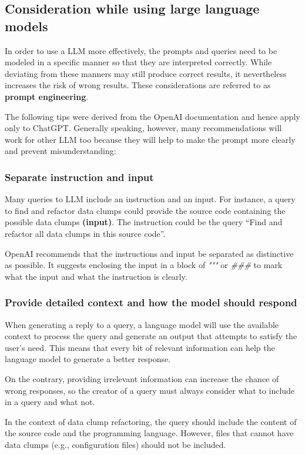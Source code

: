 \subsection{Consideration while using large language models}
In order to use a \ac{LLM} more effectively, the prompts and queries need to be modeled in a specific manner so that they are interpreted correctly. While deviating from these manners may still produce correct results, it nevertheless increases the risk of wrong results. These considerations are  referred to as \textbf{prompt engineering}.

The following tips were derived from the OpenAI documentation \cite{ChatGPT_url} and hence apply only to ChatGPT. Generally speaking, however, many recommendations will work for other \ac{LLM} too because they will help to make the prompt more clearly and prevent misunderstanding:

\subsubsection{Separate instruction and input}
Many queries to \ac{LLM} include an instruction and an input. For instance, a query to find and refactor data clumps could provide the source code containing the possible data clumps \textbf{(input)}. The instruction could be the query \enquote{Find and refactor all data clumps in this source code}. 

OpenAI recommends that the instructions and input be separated as distinctive as possible. It suggests enclosing the input in a block of \textit{"""} or \textit{\#\#\#} to mark what the input and what the instruction is clearly.

\subsubsection{Provide detailed context and how the model should respond}

When generating a reply to a query, a language model will use the available context to process the query and generate an output that attempts to satisfy the user's need. This means that every bit of relevant information can help the language model to generate a better response.

On the contrary, providing irrelevant information can increase the chance of wrong responses, so the creator of a query must always consider what to include in a query and what not. 

In the context of data clump refactoring, the query should include the content of the source code and the programming language. However, files that cannot have data clumps (e.g., configuration files) should not be included.

